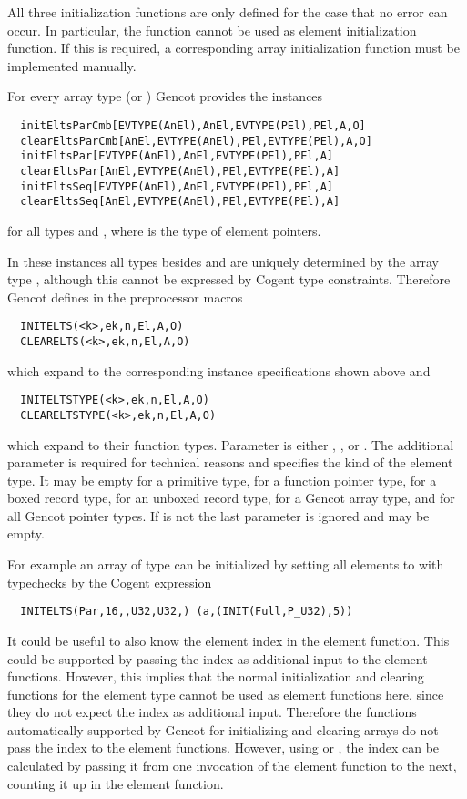 All three initialization functions are only defined for the case that no error can occur. In particular, the function
 cannot be used as element initialization function. If this is required, a corresponding array initialization
function must be implemented manually.

For every array type  (or ) Gencot provides the instances
\begin{verbatim}
  initEltsParCmb[EVTYPE(AnEl),AnEl,EVTYPE(PEl),PEl,A,O]
  clearEltsParCmb[AnEl,EVTYPE(AnEl),PEl,EVTYPE(PEl),A,O]
  initEltsPar[EVTYPE(AnEl),AnEl,EVTYPE(PEl),PEl,A]
  clearEltsPar[AnEl,EVTYPE(AnEl),PEl,EVTYPE(PEl),A]
  initEltsSeq[EVTYPE(AnEl),AnEl,EVTYPE(PEl),PEl,A]
  clearEltsSeq[AnEl,EVTYPE(AnEl),PEl,EVTYPE(PEl),A]
\end{verbatim}
for all types  and , where  is the type of element pointers.

In these instances all types besides  and  are uniquely determined by the array type , although
this cannot be expressed by Cogent type constraints. Therefore Gencot defines in 
the preprocessor macros
\begin{verbatim}
  INITELTS(<k>,ek,n,El,A,O)
  CLEARELTS(<k>,ek,n,El,A,O)
\end{verbatim}
which expand to the corresponding instance specifications shown above and
\begin{verbatim}
  INITELTSTYPE(<k>,ek,n,El,A,O)
  CLEARELTSTYPE(<k>,ek,n,El,A,O)
\end{verbatim}
which expand to their function types. Parameter  is either , , 
or . The additional parameter  is required for technical reasons and specifies the
kind of the element type. It may be empty for a primitive type,  for a function pointer type,  for
a boxed record type,  for an unboxed record type,  for a Gencot array type, and  for all Gencot 
pointer types. If  is not  the last parameter  is ignored and may be empty.

For example an array  of type  can be initialized by setting all elements to  
with typechecks by the Cogent expression
\begin{verbatim}
  INITELTS(Par,16,,U32,U32,) (a,(INIT(Full,P_U32),5))
\end{verbatim}

It could be useful to also know the element index in the element function. This could be supported by passing the index
as additional input to the element functions. However, this implies that the normal initialization and clearing functions
for the element type cannot be used as element functions here, since they do not expect the index as additional input.
Therefore the functions automatically supported by Gencot for initializing and clearing arrays do not pass the index 
to the element functions. However, using  or , the index can be calculated by
passing it from one invocation of the element function to the next, counting it up in the element function.

